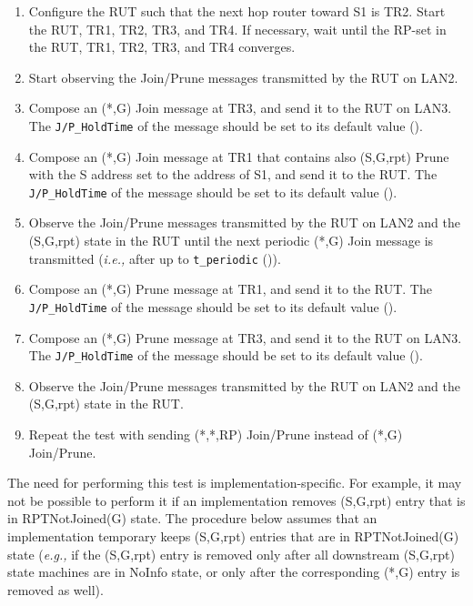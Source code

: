\documentclass[11pt]{report}
\newcommand{\ie}{\emph{i.e.,}\xspace}
\newcommand{\eg}{\emph{e.g.,}\xspace}
\begin{document}
\begin{enumerate}

  \item Configure the RUT such that the next hop router toward S1 is
  TR2. Start the RUT, TR1, TR2, TR3, and TR4. If necessary, wait until the
  RP-set in the RUT, TR1, TR2, TR3, and TR4 converges.

  \item Start observing the Join/Prune messages transmitted by the RUT on
  LAN2.

  \item Compose an (*,G) Join message at TR3, and send it to the RUT on LAN3.
  The \verb=J/P_HoldTime= of the message should be set to its default
  value ({\PimsmJPHoldTime}).

  \item Compose an (*,G) Join message at TR1 that contains also (S,G,rpt)
  Prune with the S address set to the address of S1, and send it to the RUT.
  The \verb=J/P_HoldTime= of the message should be set to its default
  value ({\PimsmJPHoldTime}).

  \item Observe the Join/Prune messages transmitted by the RUT on LAN2 and the
  (S,G,rpt) state in the RUT until the next periodic (*,G) Join message is
  transmitted (\ie after up to \verb=t_periodic= ({\PimsmTPeriodic})).

  \item Compose an (*,G) Prune message at TR1, and send it to the RUT. 
  The \verb=J/P_HoldTime= of the message should be set to its default
  value ({\PimsmJPHoldTime}).

  \item Compose an (*,G) Prune message at TR3, and send it to the RUT on LAN3.
  The \verb=J/P_HoldTime= of the message should be set to its default
  value ({\PimsmJPHoldTime}).

  \item Observe the Join/Prune messages transmitted by the RUT on LAN2 and the
  (S,G,rpt) state in the RUT.

  \item Repeat the test with sending (*,*,RP) Join/Prune instead of (*,G)
  Join/Prune.

\end{enumerate}


  The need for performing this test is implementation-specific. For example,
  it may not be possible to perform it if an implementation removes
  (S,G,rpt) entry that is in RPTNotJoined(G) state. The procedure below
  assumes that an implementation temporary keeps (S,G,rpt) entries that are in
  RPTNotJoined(G) state (\eg if the (S,G,rpt) entry is removed only after all
  downstream (S,G,rpt) state machines are in NoInfo state, or only after the
  corresponding (*,G) entry is removed as well).
\end{document}
